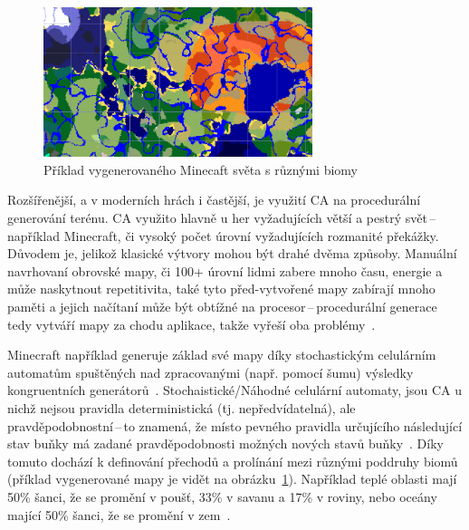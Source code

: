 \begin{figure}[H]
    \centering
    \includegraphics[width=0.7\textwidth]{obrazky-figures/ch2/minecraft_biom.png}
    \caption{Příklad vygenerovaného Minecaft světa s různými biomy}
    \label{fig:minecraft_biom}
\end{figure}

Rozšířenější, a v moderních hrách i častější, je využití CA na procedurální generování terénu. CA využito hlavně u her vyžadujících větší a pestrý svět\,--\,například Minecraft, či vysoký počet úrovní vyžadujících rozmanité překážky. Důvodem je, jelikož klasické  výtvory mohou být drahé dvěma způsoby. Manuální navrhovaní obrovské mapy, či 100+ úrovní lidmi zabere mnoho času, energie a může naskytnout repetitivita, také tyto před-vytvořené mapy zabírají mnoho paměti a jejich načítaní může být obtížné na procesor\,--\,procedurální generace tedy vytváří mapy za chodu aplikace, takže vyřeší oba problémy~\cite{Procedural_Game_Map}.

Minecraft například generuje základ své mapy díky stochastickým celulárním automatům spuštěných nad zpracovanými (např. pomocí šumu) výsledky kongruentních generátorů~\cite{Minecraft}. Stochaistické/Náhodné celulární automaty, jsou CA u nichž nejsou pravidla deterministická (tj. nepředvídatelná), ale pravděpodobnostní\,--\,to znamená, že místo pevného pravidla určujícího následující stav buňky má zadané pravděpodobnosti možných nových stavů buňky~\cite{DBLP:journals/corr/abs-1304-7185}. Díky tomuto dochází k definování přechodů a prolínání mezi různými poddruhy biomů (příklad vygenerované mapy je vidět na obrázku~\ref{fig:minecraft_biom}). Například teplé oblasti mají 50\% šanci, že se promění v poušť, 33\% v savanu a 17\% v roviny, nebo oceány mající 50\% šanci, že se promění v zem~\cite{Minecraft}.

